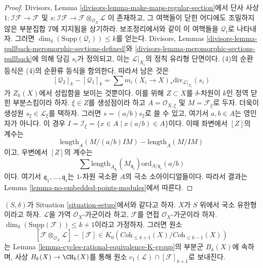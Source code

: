 \begin{proof}
Divisors, Lemma \ref{divisors-lemma-make-maps-regular-section}에서
단사 사상 $1 : \mathcal{I}\mathcal{F} \to \mathcal{F}$ 및
$s : \mathcal{I}\mathcal{F} \to \mathcal{F} \otimes_{\mathcal{O}_X}\mathcal{L}$
이 존재하고, 그 여핵들이 닫힌 어디에도 조밀하지 않은 부분집합
$T$에 지지됨을 상기하라. 보조정리에서와 같이 이 여핵들을
$\mathcal{Q}_i$로 나타내자. 그러면
$\dim_\delta(\text{Supp}(\mathcal{Q}_i)) \leq k$를 얻는다.
Divisors, Lemmas \ref{divisors-lemma-pullback-meromorphic-sections-defined}와
\ref{divisors-lemma-meromorphic-sections-pullback}에 의해 당김 $s_i$가
정의되고, 이는 $\mathcal{L}|_{X_i}$의 정칙 유리형 단면이다.
(4)의 순환 등식은 (4)의 순환류 등식을 함의한다. 따라서 남은 것은
$$
[\mathcal{Q}_2]_k - [\mathcal{Q}_1]_k
=
\sum m_i(X_i \to X)_*\text{div}_{\mathcal{L}|_{X_i}}(s_i)
$$
가 $Z_k(X)$에서 성립함을 보이는 것뿐이다. 이를 위해
$Z \subset X$를 $\delta$-차원이 $k$인 정역 닫힌 부분스킴이라 하자.
$\xi \in Z$를 생성점이라 하고 $A = \mathcal{O}_{X, \xi}$ 및
$M = \mathcal{F}_\xi$로 두자. 더욱이 생성원
$s_\xi \in \mathcal{L}_\xi$를 택하자. 그러면
$s = (a/b) s_\xi$로 쓸 수 있고, 여기서 $a, b \in A$는 영인자가
아니다. 이 경우 $I = \mathcal{I}_\xi = \{x \in A \mid x(a/b) \in A\}$이다.
이때 좌변에서 $[Z]$의 계수는
$$
\text{length}_A(M/(a/b)IM) - \text{length}_A(M/IM)
$$
이고, 우변에서 $[Z]$의 계수는
$$
\sum
\text{length}_{A_{\mathfrak q_i}}(M_{\mathfrak q_i})
\text{ord}_{A/\mathfrak q_i}(a/b)
$$
이다. 여기서 $\mathfrak q_1, \ldots, \mathfrak q_t$는 $1$-차원
국소환 $A$의 극소 소아이디얼들이다. 따라서 결과는 Lemma
\ref{lemma-no-embedded-points-modules}에서 따른다.
\end{proof}

\begin{lemma}
\label{lemma-coherent-sheaf-cap-c1}
$(S, \delta)$가 Situation \ref{situation-setup}에서와 같다고 하자.
$X$가 $S$ 위에서 국소 유한형이라고 하자.
$\mathcal{L}$을 가역 $\mathcal{O}_X$-가군이라 하고,
$\mathcal{F}$를 연접 $\mathcal{O}_X$-가군이라 하자.
$\dim_\delta(\text{Supp}(\mathcal{F})) \leq k + 1$이라고 가정하자.
그러면 원소
$$
[\mathcal{F} \otimes_{\mathcal{O}_X} \mathcal{L}]
-
[\mathcal{F}]
\in
K_0(\textit{Coh}_{\leq k + 1}(X)/\textit{Coh}_{\leq k - 1}(X))
$$
는 Lemma \ref{lemma-cycles-rational-equivalence-K-group}의 부분군
$B_k(X)$에 속하며, 사상 $B_k(X) \to \CH_k(X)$를 통해 원소
$c_1(\mathcal{L}) \cap [\mathcal{F}]_{k + 1}$로 보내진다.
\end{lemma}

